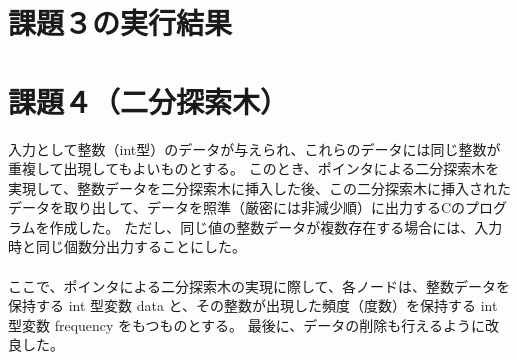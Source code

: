 \documentclass[]{jsarticle}
\begin{document}
\section*{課題３の実行結果}

\newpage
\section*{課題４（二分探索木）}
入力として整数（int型）のデータが与えられ、これらのデータには同じ整数が重複して出現してもよいものとする。
このとき、ポインタによる二分探索木を実現して、整数データを二分探索木に挿入した後、この二分探索木に挿入されたデータを取り出して、データを照準（厳密には非減少順）に出力するCのプログラムを作成した。
ただし、同じ値の整数データが複数存在する場合には、入力時と同じ個数分出力することにした。\\
\\ここで、ポインタによる二分探索木の実現に際して、各ノードは、整数データを保持する int 型変数 data と、その整数が出現した頻度（度数）を保持する int 型変数 frequency をもつものとする。
最後に、データの削除も行えるように改良した。\\
\end{document}
